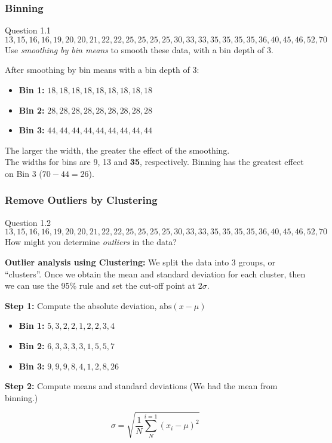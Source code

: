 \documentclass[aspectratio=169, 10pt]{beamer}
\begin{document}
\begin{frame}[t]
    \frametitle{Binning}

    \begin{block}{Question 1.1}
        \[13,15,16,16,19,20,20,21,22,22,25,25,25,25,30,33,33,35,35,35,35,36,40,45,46,52,70\]
        Use \textit{smoothing by bin means} to smooth these data, with a bin depth of 3.
    \end{block}

    After smoothing by bin means with a bin depth of 3:
    \begin{itemize}
        \item \textbf{Bin 1:} $18, 18, 18, 18, 18, 18, 18, 18, 18$
        \item \textbf{Bin 2:} $28, 28, 28, 28, 28, 28, 28, 28, 28$
        \item \textbf{Bin 3:} $44, 44, 44, 44, 44, 44, 44, 44, 44$
    \end{itemize}

    The larger the width, the greater the effect of the smoothing.\\
    The widths for bins are 9, 13 and \textbf{35}, respectively. Binning has the greatest effect on Bin 3 ($70-44=26$).
\end{frame}

\begin{frame}[t]
    \frametitle{Remove Outliers by Clustering}

    \begin{block}{Question 1.2}
        \[13,15,16,16,19,20,20,21,22,22,25,25,25,25,30,33,33,35,35,35,35,36,40,45,46,52,70\]
        How might you determine \textit{outliers} in the data?
    \end{block}

    \textbf{Outlier analysis using Clustering:} We split the data into 3 groups, or ``clusters''.
    Once we obtain the mean and standard deviation for each cluster, 
    then we can use the 95\% rule and set the cut-off point at $2\sigma$.

    \textbf{Step 1:} Compute the absolute deviation, $\text{abs}(x - \mu)$

    \begin{itemize}
        \item \textbf{Bin 1:} $5, 3, 2, 2, 1, 2, 2, 3, 4$
        \item \textbf{Bin 2:} $6, 3, 3, 3, 3, 1, 5, 5, 7$
        \item \textbf{Bin 3:} $ 9,  9,  9,  8,  4,  1,  2,  8, 26$
    \end{itemize}

    \textbf{Step 2:} Compute means and standard deviations (We had the mean from binning.) 

    \[\sigma = \sqrt{\frac{1}{N}\sum_{N}^{i=1}(x_i-\mu)^2}\]

\end{frame}
\end{document}
